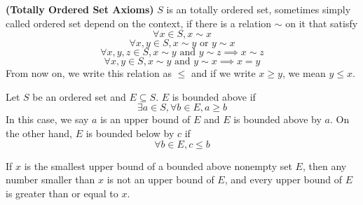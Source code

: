 \documentclass{report}
\begin{document}
\begin{definition}
\label{1.1.4}
\textbf{(Totally Ordered Set Axioms)} $S$ is an totally ordered set, sometimes simply called  ordered set depend on the context, if there is a relation $\sim$ on it that satisfy 
\begin{equation}
\forall x\in S, x\sim x
\end{equation}
\begin{equation}
\forall x,y\in S, x\sim y\text{ or }y\sim x
\end{equation}
\begin{equation}
  \forall x,y,z\in S, x\sim y \text{ and }y\sim z\implies x\sim z
\end{equation}
\begin{equation}
\forall x,y\in S, x\sim y\text{ and }y\sim x \implies x=y
\end{equation}
From now on, we write this relation as $\leq $ and if we write  $x\geq y$, we mean $y\leq x$.
\end{definition}
\begin{definition}
\label{1.1.5}
Let $S$ be an ordered set and $E\subseteq S$. $E$ is bounded above if 
\begin{equation}
\exists a\in S, \forall b\in E, a\geq b 
\end{equation}
In this case, we say $a$ is an upper bound of $E$ and $E$ is bounded above by $a$. On the other hand, $E$ is bounded below by $c$ if
\begin{equation}
\forall b\in E, c\leq b
\end{equation}
\end{definition}
\begin{theorem}
\label{1.1.6}
If $x$ is the smallest upper bound of a bounded above nonempty set  $E$, then any number smaller than  $x$ is not an upper bound of  $E$, and every upper bound of  $E$ is greater than or equal  to $x$.
\end{theorem}
\end{document}
